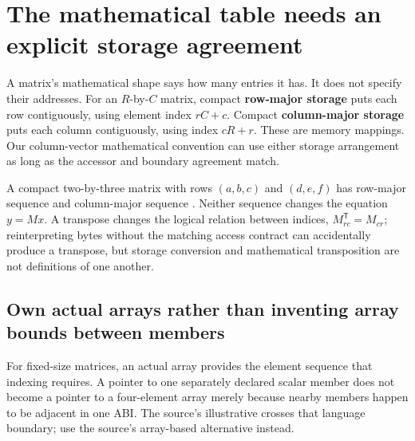 \section{The mathematical table needs an explicit storage agreement}\label{02-foundations-ii-ch038-the-mathematical-table-needs-an-explicit-storage-agreement}

\hypertarget{02-foundations-ii-ch038-the-mathematical-table-needs-an-explicit-storage-agreement}{}

A matrix's mathematical shape says how many entries it has. It does not specify their addresses. For an \(R\)-by-\(C\) matrix, compact \textbf{row-major storage} puts each row contiguously, using element index \(rC+c\). Compact \textbf{column-major storage} puts each column contiguously, using index \(cR+r\). These are memory mappings. Our column-vector mathematical convention can use either storage arrangement as long as the accessor and boundary agreement match.

A compact two-by-three matrix with rows \((a,b,c)\) and \((d,e,f)\) has row-major sequence  and column-major sequence . Neither sequence changes the equation \(y=Mx\). A transpose changes the logical relation between indices, \(M^{\mathsf T}_{rc}=M_{cr}\); reinterpreting bytes without the matching access contract can accidentally produce a transpose, but storage conversion and mathematical transposition are not definitions of one another.

\subsection{Own actual arrays rather than inventing array bounds between members}\label{02-foundations-ii-ch038-own-actual-arrays-rather-than-inventing-array-bounds-between-members}

\hypertarget{02-foundations-ii-ch038-own-actual-arrays-rather-than-inventing-array-bounds-between-members}{}

For fixed-size matrices, an actual array provides the element sequence that indexing requires. A pointer to one separately declared scalar member does not become a pointer to a four-element array merely because nearby members happen to be adjacent in one ABI. The source's illustrative  crosses that language boundary; use the source's array-based alternative instead.

